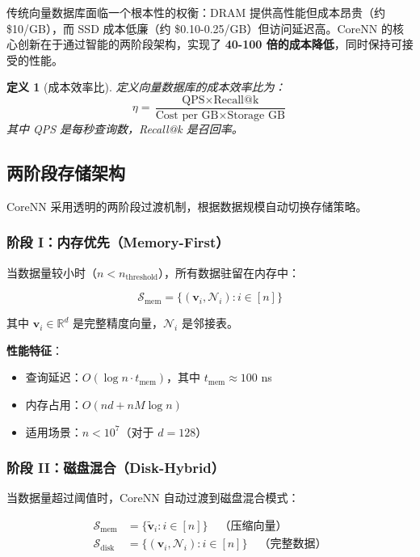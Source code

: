 \documentclass[12pt,a4paper]{article}
\newtheorem{definition}{定义}[section]
\begin{document}
传统向量数据库面临一个根本性的权衡：DRAM 提供高性能但成本昂贵（约 \$10/GB），而 SSD 成本低廉（约 \$0.10-0.25/GB）但访问延迟高。CoreNN 的核心创新在于通过智能的两阶段架构，实现了 \textbf{40-100 倍的成本降低}，同时保持可接受的性能。

\begin{definition}[成本效率比]
定义向量数据库的成本效率比为：
\begin{equation}
\eta = \frac{\text{QPS} \times \text{Recall@k}}{\text{Cost per GB} \times \text{Storage GB}}
\end{equation}
其中 QPS 是每秒查询数，Recall@k 是召回率。
\end{definition}

\subsection{两阶段存储架构}

CoreNN 采用透明的两阶段过渡机制，根据数据规模自动切换存储策略。

\subsubsection{阶段 I：内存优先（Memory-First）}

当数据量较小时（$n < n_{\text{threshold}}$），所有数据驻留在内存中：

\begin{equation}
\mathcal{S}_{\text{mem}} = \{(\mathbf{v}_i, \mathcal{N}_i) : i \in [n]\}
\end{equation}

其中 $\mathbf{v}_i \in \mathbb{R}^d$ 是完整精度向量，$\mathcal{N}_i$ 是邻接表。

\textbf{性能特征}：
\begin{itemize}
    \item 查询延迟：$O(\log n \cdot t_{\text{mem}})$，其中 $t_{\text{mem}} \approx 100$ ns
    \item 内存占用：$O(nd + nM\log n)$
    \item 适用场景：$n < 10^7$（对于 $d=128$）
\end{itemize}

\subsubsection{阶段 II：磁盘混合（Disk-Hybrid）}

当数据量超过阈值时，CoreNN 自动过渡到磁盘混合模式：

\begin{equation}
\begin{aligned}
\mathcal{S}_{\text{mem}} &= \{\tilde{\mathbf{v}}_i : i \in [n]\} \quad \text{（压缩向量）} \\
\mathcal{S}_{\text{disk}} &= \{(\mathbf{v}_i, \mathcal{N}_i) : i \in [n]\} \quad \text{（完整数据）}
\end{aligned}
\end{equation}
\end{document}
